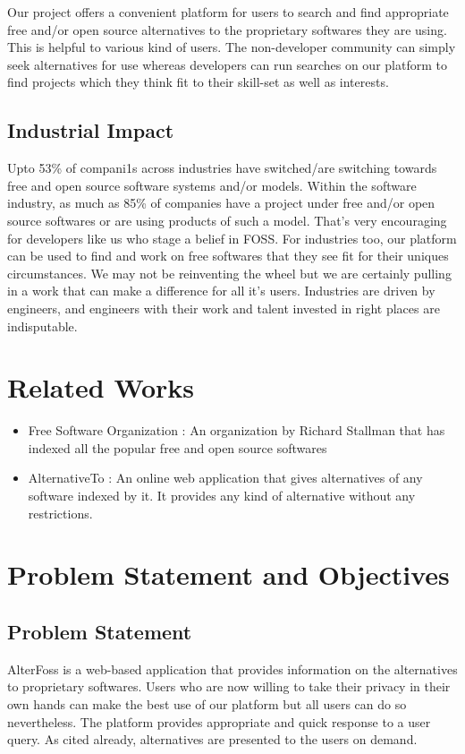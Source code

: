 Our project offers a convenient platform for users to search and find appropriate free and/or open source alternatives to the proprietary softwares they are using. This is helpful to various kind of users. The non-developer community can simply seek alternatives for use whereas developers can run searches on our platform to find projects which they think fit to their skill-set as well as interests. 

\subsection{Industrial Impact}
Upto 53\% of compani1s across industries have switched/are switching towards free and open source software systems and/or models. Within the software industry, as much as 85\% of companies have a project under free and/or open source softwares or are using products of such a model. That’s very encouraging for developers like us who stage a belief in FOSS. For industries too, our platform can be used to find and work on free softwares that they see fit for their uniques circumstances. We may not be reinventing the wheel but we are certainly pulling in a work that can make a difference for all it’s users. Industries are driven by engineers, and engineers with their work and talent invested in right places are indisputable. 


\section{Related Works}
\begin{itemize}
\item Free Software Organization : An organization by Richard Stallman that has indexed all the popular free and open source softwares
\item AlternativeTo : An online web application that gives alternatives of any software indexed by it. It provides any kind of alternative without any restrictions.

\end{itemize}


\section{Problem Statement and Objectives}

\subsection{Problem Statement}
AlterFoss is a web-based application that provides information on the alternatives to proprietary softwares. Users who are now willing to take their privacy in their own hands can make the best use of our platform but all users can do so nevertheless. The platform provides appropriate and quick response to a user query. As cited already, alternatives are presented to the users on demand. 

